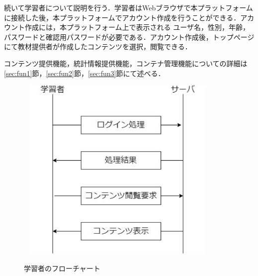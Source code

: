 \newpage
続いて学習者について説明を行う．学習者はWebブラウザで本プラットフォームに接続した後，本プラットフォームでアカウント作成を行うことができる．アカウント作成には，本プラットフォーム上で表示される
ユーザ名，性別，年齢，パスワードと確認用パスワードが必要である．アカウント作成後，トップページにて教材提供者が作成したコンテンツを選択，閲覧できる．

コンテンツ提供機能，統計情報提供機能，コンテナ管理機能についての詳細は\ref{sec:fun1}節，\ref{sec:fun2}節，\ref{sec:fun3}節にて述べる．

\begin{figure}[htbp]
    \begin{center}
        \includegraphics[width=10cm,height=9cm,keepaspectratio]{learn_flow-crop.pdf}\\
    \end{center}
    \caption{学習者のフローチャート}
    \label{learn_flow}
\end{figure}